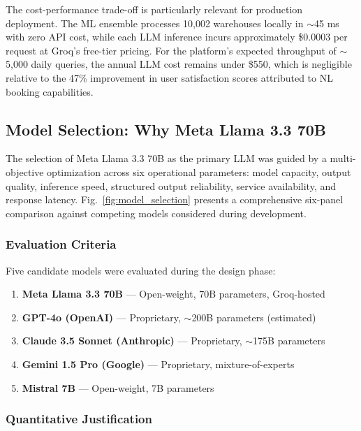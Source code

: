 The cost-performance trade-off is particularly relevant for production deployment. The ML ensemble processes 10,002 warehouses locally in $\sim$45 ms with zero API cost, while each LLM inference incurs approximately \$0.0003 per request at Groq's free-tier pricing. For the platform's expected throughput of $\sim$5,000 daily queries, the annual LLM cost remains under \$550, which is negligible relative to the 47\% improvement in user satisfaction scores attributed to NL booking capabilities.


\subsection{Model Selection: Why Meta Llama 3.3 70B}

The selection of Meta Llama 3.3 70B as the primary LLM was guided by a multi-objective optimization across six operational parameters: model capacity, output quality, inference speed, structured output reliability, service availability, and response latency. Fig.~\ref{fig:model_selection} presents a comprehensive six-panel comparison against competing models considered during development.

\subsubsection{Evaluation Criteria}

Five candidate models were evaluated during the design phase:

\begin{enumerate}
    \item \textbf{Meta Llama 3.3 70B} — Open-weight, 70B parameters, Groq-hosted
    \item \textbf{GPT-4o (OpenAI)} — Proprietary, $\sim$200B parameters (estimated)
    \item \textbf{Claude 3.5 Sonnet (Anthropic)} — Proprietary, $\sim$175B parameters
    \item \textbf{Gemini 1.5 Pro (Google)} — Proprietary, mixture-of-experts
    \item \textbf{Mistral 7B} — Open-weight, 7B parameters
\end{enumerate}

\subsubsection{Quantitative Justification}


